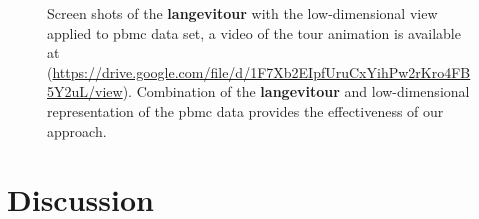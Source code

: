\documentclass[
  12pt]{article}
\begin{document}
\begin{figure}
\begin{minipage}[t]{0.33\linewidth}
{{}

}

\subcaption{\label{fig-pbmc_sc2}}
\end{minipage}%
%
\begin{minipage}[t]{0.33\linewidth}

{\centering 


}

\subcaption{\label{fig-pbmc_sc3}}
\end{minipage}%

\caption{\label{fig-pbmc_sc}Screen shots of the \textbf{langevitour}
with the low-dimensional view applied to pbmc data set, a video of the
tour animation is available at
(\url{https://drive.google.com/file/d/1F7Xb2EIpfUruCxYihPw2rKro4FB5Y2uL/view}).
Combination of the \textbf{langevitour} and low-dimensional
representation of the pbmc data provides the effectiveness of our
approach.}

\end{figure}

\hypertarget{sec-discussion}{%
\section{Discussion}\label{sec-discussion}}
\end{document}
